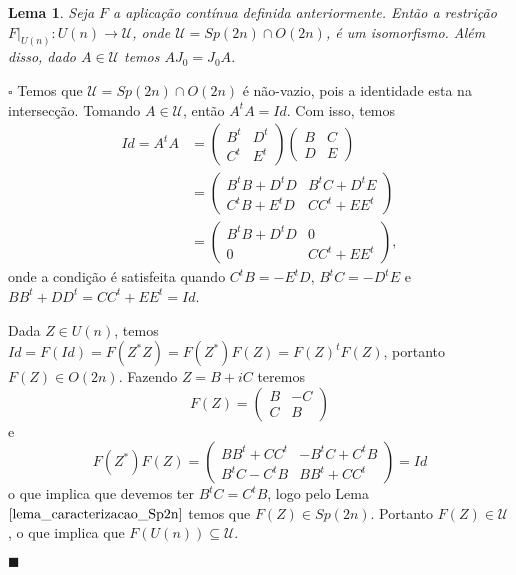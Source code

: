 \documentclass[12pt]{book}
\newtheorem{lema}[teorema]{Lema}
\newenvironment{prova}[1]{$\square$ #1}{\hfill$\blacksquare$}
\newcommand{\estruturacomplexa}{J_{0}}
\newcommand{\gruposimpletico}[1]{Sp(#1)}
\newcommand{\matrizortogonal}[1]{O(#1)}
\newcommand{\matrizSimpleticaOrtogonal}{\mathcal{U}}
\newcommand{\matrizunitaria}[1]{U(#1)}
\begin{document}
	\begin{lema}\label{lema_isomorfismo_U}
		Seja $F$ a aplicação contínua definida anteriormente. Então a restrição $F|_{\matrizunitaria{n}}: \matrizunitaria{n} \to \matrizSimpleticaOrtogonal $, onde $\matrizSimpleticaOrtogonal  = \gruposimpletico{2n}\cap \matrizortogonal{2n}$, é um isomorfismo. Além disso, dado $A \in \matrizSimpleticaOrtogonal $ temos $A\estruturacomplexa=\estruturacomplexa A$.
	\end{lema}
	\begin{prova}
		Temos que $\matrizSimpleticaOrtogonal  = \gruposimpletico{2n} \cap \matrizortogonal{2n}$ é não-vazio, pois a identidade esta na intersecção. Tomando $A \in \matrizSimpleticaOrtogonal $, então $A^{t}A= Id$. Com isso, temos
		$$
		\begin{aligned}
		Id=A^{t}A &=
		\left(
		\begin{array}{cc}
		B^{t} & D^{t}
		\\
		C^{t} & E^{t}
		\end{array}
		\right)
		\left(
		\begin{array}{cc}
		B & C
		\\
		D & E
		\end{array}
		\right)
		\\
		&= 
		\left(
		\begin{array}{cc}
		B^{t}B + D^{t}D & B^{t}C + D^{t}E 
		\\
		C^{t}B + E^{t}D  & CC^{t}+EE^{t}
		\end{array}
		\right)
		\\
		&=
		\left(
		\begin{array}{cc}
		B^{t}B + D^{t}D & 0 
		\\
		0 & CC^{t}+EE^{t}
		\end{array}
		\right),
		\end{aligned}
		$$
		onde a condição é satisfeita quando $C^{t}B =- E^{t}D$, $B^{t}C =- D^{t}E$ e $BB^{t} + DD^{t} = CC^{t}+EE^{t} = Id$. 
		
		Dada $Z \in \matrizunitaria{n}$, temos $Id=F(Id) = F(Z^{*}Z) = F(Z^{*})F(Z) = F(Z)^{t}F(Z)$, portanto $F(Z) \in \matrizortogonal{2n}$. Fazendo $Z= B+iC$ teremos
		$$
		F(Z)=
		\left(
		\begin{array}{cc}
		B & -C
		\\
		C & B
		\end{array}
		\right)
		$$
		e
		$$
		F(Z^{*})F(Z)=
		\left(
		\begin{array}{cc}
		BB^{t} +CC^{t} & -B^{t}C +C^{t}B
		\\
		B^{t}C -C^{t}B & BB^{t} +CC^{t}
		\end{array}
		\right)	
		= Id
		$$
		o que implica que devemos ter $B^{t}C =C^{t}B$, logo pelo Lema $\ref{lema_caracterizacao_Sp2n}$ temos que $F(Z) \in \gruposimpletico{2n}$. Portanto $F(Z) \in \matrizSimpleticaOrtogonal $, o que implica que $F(\matrizunitaria{n}) \subseteq \matrizSimpleticaOrtogonal$.
		

\end{prova}
\end{document}
